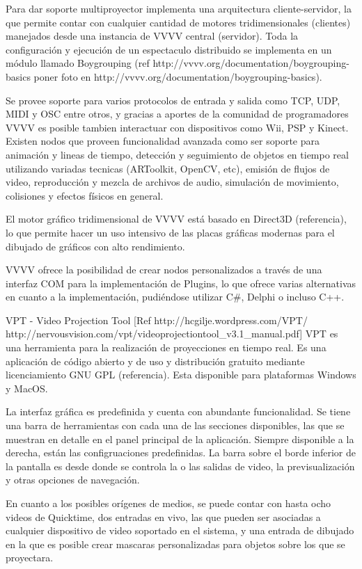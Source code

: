 Para dar soporte multiproyector implementa una arquitectura cliente-servidor, la que permite contar con cualquier cantidad de motores tridimensionales (clientes) manejados desde una instancia de VVVV central (servidor). Toda la configuración y ejecución de un espectaculo distribuido se implementa en un módulo llamado Boygrouping (ref http://vvvv.org/documentation/boygrouping-basics poner foto en http://vvvv.org/documentation/boygrouping-basics).

Se provee soporte para varios protocolos de entrada y salida como TCP, UDP, MIDI y OSC entre otros, y gracias a aportes de la comunidad de programadores VVVV es posible tambien interactuar con dispositivos como Wii, PSP y Kinect. Existen nodos que proveen funcionalidad avanzada como ser soporte para animación y lineas de tiempo, detección y seguimiento de objetos en tiempo real utilizando variadas tecnicas (ARToolkit, OpenCV, etc), emisión de flujos de video, reproducción y mezcla de archivos de audio, simulación de movimiento, colisiones y efectos físicos en general.

El motor gráfico tridimensional de VVVV está basado en Direct3D (referencia), lo que permite hacer un uso intensivo de las placas gráficas modernas para el dibujado de gráficos con alto rendimiento.

VVVV ofrece la posibilidad de crear nodos personalizados a través de una interfaz COM para la implementación de Plugins, lo que ofrece varias alternativas en cuanto a la implementación, pudiéndose utilizar C#, Delphi o incluso C++.


VPT - Video Projection Tool
[Ref http://hcgilje.wordpress.com/VPT/
http://nervousvision.com/vpt/videoprojectiontool_v3.1_manual.pdf]
VPT es una herramienta para la realización de proyecciones en tiempo real. Es una aplicación de código abierto y de uso y distribución gratuito mediante licenciamiento GNU GPL (referencia). Esta disponible para plataformas Windows y MacOS.

La interfaz gráfica es predefinida y cuenta con abundante funcionalidad. Se tiene una barra de herramientas con cada una de las secciones disponibles, las que se muestran en detalle en el panel principal de la aplicación. Siempre disponible a la derecha, están las configruaciones predefinidas. La barra sobre el borde inferior de la pantalla es desde donde se controla la o las salidas de video, la previsualización y otras opciones de navegación.

En cuanto a los posibles orígenes de medios, se puede contar con hasta ocho videos de Quicktime, dos entradas en vivo, las que pueden ser asociadas a cualquier dispositivo de video soportado en el sistema, y una entrada de dibujado en la que es posible crear mascaras personalizadas para objetos sobre los que se proyectara.

